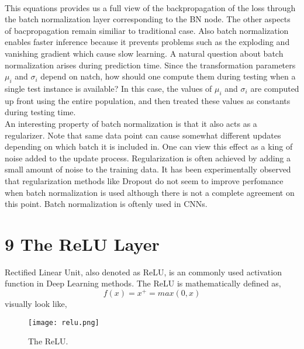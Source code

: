 \documentclass[11pt]{article}
\begin{document}
\\
This equations provides us a full view of the backpropagation of the loss through the batch normalization layer corresponding to the BN node. The other aspects of bacpropagation remain similiar to traditional case. Also batch normalization enables faster inference because it prevents problems such as the exploding and vanishing gradient which cause slow learning. A natural question about batch normalization arises during prediction time. Since the transformation parameters $\mu_i$ and $\sigma_i$ depend on natch, how should one compute them during testing when a single test instance is available? In this case, the values of $\mu_i$ and $\sigma_i$ are computed up front using the entire population, and then treated these values as constants during testing time. \\
An interesting property of batch normalization is that it also acts as a regularizer. Note that same data point can cause somewhat different updates depending on which batch it is included in. One can view this effect as a king of noise added to the update process. Regularization is often achieved by adding a small amount of noise to the training data. It has been experimentally observed that regularization methods like Dropout do not seem to improve perfomance when batch normalization is used although there is not a complete agreement on this point. Batch normalization is oftenly used in CNNs. 

\section{9 The ReLU Layer}
\hspace*{1cm} Rectified Linear Unit, also denoted as ReLU, is an commonly used activation function in Deep Learning methods. The ReLU is mathematically defined as, $$f(x) = x^+ = max(0,x)$$
visually look like,
\begin{figure}[H]
\centering
\texttt{[image: relu.png]}
\caption{The ReLU.}
\label{fig:figure3}
\end{figure}
\pagebreak
\end{document}
